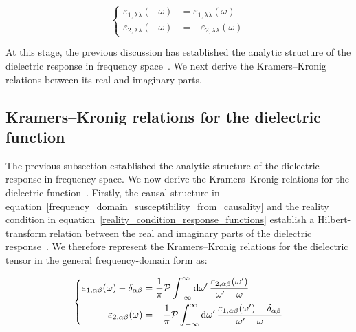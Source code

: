 \begin{equation}
\left\{\begin{aligned}
    \varepsilon_{1,\lambda\lambda}(-\omega)
    &= \varepsilon_{1,\lambda\lambda}(\omega) \\
    \varepsilon_{2,\lambda\lambda}(-\omega)
    &= -\varepsilon_{2,\lambda\lambda}(\omega)
\end{aligned}\right.
\label{parity_of_dielectric_components}
\end{equation}

At this stage, the previous discussion has established the analytic structure of the dielectric response in frequency space~\cite{nussenzveig1972causality,franta2020symmetry,leon2026momentum}.
We next derive the Kramers--Kronig relations between its real and imaginary parts.

\subsection{Kramers--Kronig relations for the dielectric function}

The previous subsection established the analytic structure of the dielectric response in frequency space.
We now derive the Kramers--Kronig relations for the dielectric function~\cite{toll1956causality}.
Firstly, the causal structure in equation~\eqref{frequency_domain_susceptibility_from_causality} and the reality condition in equation~\eqref{reality_condition_response_functions}
establish a Hilbert-transform relation between the real and imaginary parts of the dielectric response~\cite{stefanski2022analytical,koutserimpas2024time,franta2020symmetry}.
We therefore represent the Kramers--Kronig relations for the dielectric tensor in the general frequency-domain form as:

\begin{equation}
\left\{\begin{aligned}
    \varepsilon_{1,\alpha\beta}(\omega)-\delta_{\alpha\beta} &=
    \frac{1}{\pi}\mathcal{P}
    \int_{-\infty}^{\infty}\mathrm{d}{\omega'}\,
    \frac{\varepsilon_{2,\alpha\beta}(\omega')}{\omega'-\omega} \\
\varepsilon_{2,\alpha\beta}(\omega) &=
    -\frac{1}{\pi}\mathcal{P}
    \int_{-\infty}^{\infty}\mathrm{d}{\omega'}\,
    \frac{\varepsilon_{1,\alpha\beta}(\omega')-\delta_{\alpha\beta}}{\omega'-\omega}
\end{aligned}\right.
\label{kk_general_dielectric_tensor}
\end{equation}

